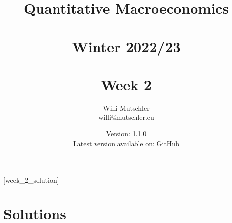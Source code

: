 
\newif\ifDisplaySolutions\DisplaySolutionstrue


\title{Quantitative Macroeconomics\\~\\Winter 2022/23\\~\\Week 2}
\author{Willi Mutschler\\willi@mutschler.eu}
\date{Version: 1.1.0\\Latest version available on: \href{https://github.com/wmutschl/Quantitative-Macroeconomics/releases/latest/download/week_2.pdf}{GitHub}}
\maketitle\thispagestyle{empty}

\newpage
{}[week_2_solution]
\tableofcontents\thispagestyle{empty}\newpage

\setcounter{page}{1}
\newpage
\newpage
\newpage
\printbibliography
\newpage

\ifDisplaySolutions
\newpage
\appendix
\section{Solutions}

\fi
